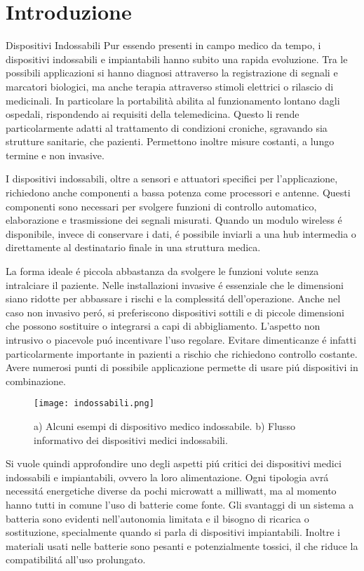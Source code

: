 \chapter{Introduzione}

\begin{section}{Dispositivi Indossabili}
    Pur essendo presenti in campo medico da tempo, i dispositivi indossabili e impiantabili hanno subito una rapida evoluzione. Tra le possibili applicazioni si hanno diagnosi attraverso la registrazione di segnali e marcatori biologici, ma anche terapia attraverso stimoli elettrici o rilascio di medicinali. In particolare la portabilit\`a abilita al funzionamento lontano dagli ospedali, rispondendo ai requisiti della telemedicina. Questo li rende particolarmente adatti al trattamento di condizioni croniche, sgravando sia strutture sanitarie, che pazienti. Permettono inoltre misure costanti, a lungo termine e non invasive. 

    I dispositivi indossabili, oltre a sensori e attuatori specifici per l'applicazione, richiedono anche componenti a bassa potenza come processori e antenne. Questi componenti sono necessari per svolgere funzioni di controllo automatico, elaborazione e trasmissione dei segnali misurati. Quando un modulo wireless \'e disponibile, invece di conservare i dati, \'e possibile inviarli a una hub intermedia o direttamente al destinatario finale in una struttura medica.

    La forma ideale \'e piccola abbastanza da svolgere le funzioni volute senza intralciare il paziente. Nelle installazioni invasive \'e essenziale che le dimensioni siano ridotte per abbassare i rischi e la complessit\'a dell'operazione. Anche nel caso non invasivo per\'o, si preferiscono dispositivi sottili e di piccole dimensioni che possono sostituire o integrarsi a capi di abbigliamento. L'aspetto non intrusivo o piacevole pu\'o incentivare l'uso regolare. Evitare dimenticanze \'e infatti particolarmente importante in pazienti a rischio che richiedono controllo costante. Avere numerosi punti di possibile applicazione permette di usare pi\'u dispositivi in combinazione.

    \begin{figure}[H]
        \texttt{[image: indossabili.png]}
        \centering
        \caption{a) Alcuni esempi di dispositivo medico indossabile. b) Flusso informativo dei dispositivi medici indossabili.}
        \label{fig:indossabili}
    \end{figure}
    
    Si vuole quindi approfondire uno degli aspetti pi\'u critici dei dispositivi medici indossabili e impiantabili, ovvero la loro alimentazione. Ogni tipologia avr\'a necessit\'a energetiche diverse da pochi microwatt a milliwatt, ma al momento hanno tutti in comune l'uso di batterie come fonte. Gli svantaggi di un sistema a batteria sono evidenti nell'autonomia limitata e il bisogno di ricarica o sostituzione, specialmente quando si parla di dispositivi impiantabili. Inoltre i materiali usati nelle batterie sono pesanti e potenzialmente tossici, il che riduce la compatibilit\'a all'uso prolungato.
\end{section}

